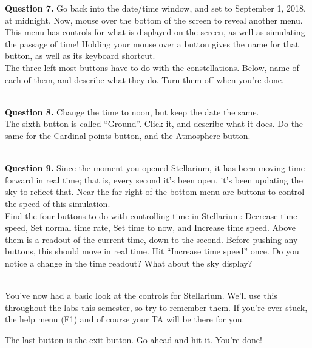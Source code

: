 \documentclass[11pt]{article}
\begin{document}
\newpage

\textbf{Question 7.} Go back into the date/time window, and set to September 1, 2018, at midnight. Now, mouse over the bottom of the screen to reveal another menu. This menu has controls for what is displayed on the screen, as well as simulating the passage of time! Holding your mouse over a button gives the name for that button, as well as its keyboard shortcut.\\

The three left-most buttons have to do with the constellations. Below, name of each of them, and describe what they do. Turn them off when you're done. \\
\vspace*{1.5cm}

\hrulefill\\   

\textbf{Question 8.} Change the time to noon, but keep the date the same.\\

The sixth button is called ``Ground''. Click it, and describe what it does. Do the same for the Cardinal points button, and the Atmosphere button.
\vspace*{1.5cm}

\hrulefill\\ 

\textbf{Question 9.} Since the moment you opened Stellarium, it has been moving time forward in real time; that is, every second it's been open, it's been updating the sky to reflect that. Near the far right of the bottom menu are buttons to control the speed of this simulation. \\

Find the four buttons to do with controlling time in Stellarium: Decrease time speed, Set normal time rate, Set time to now, and Increase time speed. Above them is a readout of the current time, down to the second. Before pushing any buttons, this should move in real time. Hit ``Increase time speed'' once. Do you notice a change in the time readout? What about the sky display?
\vspace*{1.5cm}

\hrulefill\\

You've now had a basic look at the controls for Stellarium. We'll use this throughout the labs this semester, so try to remember them. If you're ever stuck, the help menu (F1) and of course your TA will be there for you.

The last button is the exit button. Go ahead and hit it. You're done!
\end{document}
